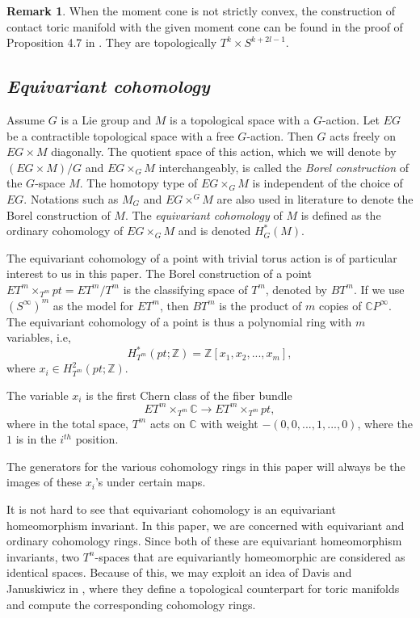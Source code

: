\documentclass[12pt]{amsart}
\def\Z {{\mathbb{Z}}}
\def\C {{\mathbb{C}}}
\theoremstyle{definition}
\newtheorem{remark}[theorem]{Remark}
\numberwithin{equation}{section}
\begin{document}
\begin{remark}
When the moment cone is not strictly convex, the construction of
contact toric manifold with the given moment cone can be found in
the proof of Proposition 4.7 in \cite{LS:integrable torus actions}.
They are topologically $T^k\times S^{k+2l-1}$.
\end{remark}

\subsection {\it Equivariant cohomology}

Assume $G$ is a Lie group and $M$ is a topological space with a
$G$-action. Let $EG$ be a contractible topological space with a free
$G$-action. Then $G$ acts freely on $EG\times M$ diagonally. The
quotient space of this action, which we will denote by $(EG\times
M)/G$ and $EG\times_{G}M$ interchangeably, is called the {\em Borel
construction} of the $G$-space $M$. The homotopy type of
$EG\times_{G}M$ is independent of the choice of $EG$. Notations such
as $M_{G}$ and $EG\times^{G}M$ are also used in literature to denote
the Borel construction of $M$. The {\em equivariant cohomology} of
$M$ is defined as the ordinary cohomology of $EG\times_{G}M$ and is
denoted $H_{G}^{*}(M)$.

The equivariant cohomology of a point with trivial torus action is
of particular interest to us in this paper. The Borel construction
of a point $ET^m\times_{T^m}pt =ET^m/T^m$ is the classifying space
of $T^m$, denoted by $BT^m$. If we use $(S^{\infty})^{m}$ as the
model for $ET^m$, then $BT^m$ is the product of $m$ copies of $\C
P^{\infty}$. The equivariant cohomology of a point is thus a
polynomial ring with $m$ variables, i.e,
\begin{equation}
H_{T^m}^{*}(pt;\Z) = \Z[x_{1},x_{2},...,x_{m}],
\end{equation}
where $x_{i}\in H^{2}_{T^m}(pt;\Z)$.

 The variable $x_{i}$ is the first Chern class of the fiber bundle
\begin{equation}
ET^m\times_{T^m}\C\rightarrow ET^m\times_{T^m}pt,
\end{equation}
where in the total space, $T^m$ acts on $\C$ with weight
$-(0,0,...,1,...,0)$, where the $1$ is in the $i^{th}$ position.

The generators for the various cohomology rings in this paper will
always be the images of these $x_{i}$'s under certain maps.

It is not hard to see that equivariant cohomology is an equivariant
homeomorphism invariant. In this paper, we are concerned with
equivariant and ordinary cohomology rings. Since both of these are
equivariant homeomorphism invariants, two $T^n$-spaces that are
equivariantly homeomorphic are considered as identical spaces.
Because of this, we may exploit an idea of Davis and Januskiwicz in
\cite{DJ}, where they define a topological counterpart for toric
manifolds and compute the corresponding cohomology rings.
\end{document}
